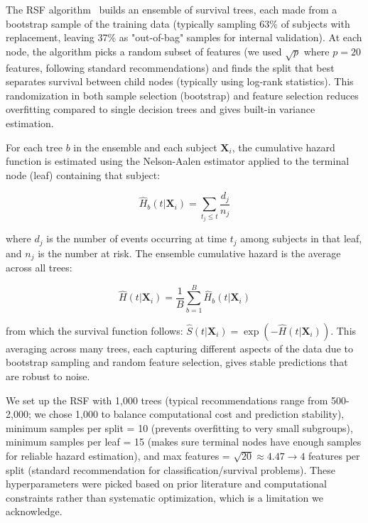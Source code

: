 \documentclass[blue]{ludusofficial}  %
\begin{document}
The RSF algorithm~\cite{ishwaran2008rsf} builds an ensemble of survival trees, each made from a bootstrap sample of the training data (typically sampling 63\% of subjects with replacement, leaving 37\% as "out-of-bag" samples for internal validation). At each node, the algorithm picks a random subset of features (we used $\sqrt{p}$ where $p=20$ features, following standard recommendations) and finds the split that best separates survival between child nodes (typically using log-rank statistics). This randomization in both sample selection (bootstrap) and feature selection reduces overfitting compared to single decision trees and gives built-in variance estimation.

For each tree $b$ in the ensemble and each subject $\mathbf{X}_i$, the cumulative hazard function is estimated using the Nelson-Aalen estimator applied to the terminal node (leaf) containing that subject:

\begin{equation}
    \hat{H}_b(t | \mathbf{X}_i) = \sum_{t_j \leq t} \frac{d_j}{n_j}
\end{equation}

where $d_j$ is the number of events occurring at time $t_j$ among subjects in that leaf, and $n_j$ is the number at risk. The ensemble cumulative hazard is the average across all trees:

\begin{equation}
    \hat{H}(t | \mathbf{X}_i) = \frac{1}{B} \sum_{b=1}^{B} \hat{H}_b(t | \mathbf{X}_i)
\end{equation}

from which the survival function follows: $\hat{S}(t | \mathbf{X}_i) = \exp(-\hat{H}(t | \mathbf{X}_i))$. This averaging across many trees, each capturing different aspects of the data due to bootstrap sampling and random feature selection, gives stable predictions that are robust to noise.

We set up the RSF with 1,000 trees (typical recommendations range from 500-2,000; we chose 1,000 to balance computational cost and prediction stability), minimum samples per split = 10 (prevents overfitting to very small subgroups), minimum samples per leaf = 15 (makes sure terminal nodes have enough samples for reliable hazard estimation), and max features = $\sqrt{20} \approx 4.47 \rightarrow 4$ features per split (standard recommendation for classification/survival problems). These hyperparameters were picked based on prior literature and computational constraints rather than systematic optimization, which is a limitation we acknowledge.
\end{document}
